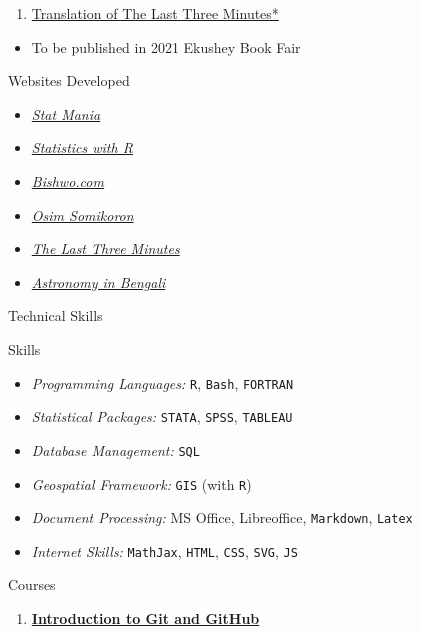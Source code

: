\documentclass[
]{book}
\providecommand{\tightlist}{%
  \setlength{\itemsep}{0pt}\setlength{\parskip}{0pt}}
\begin{document}
\begin{enumerate}
\def\labelenumi{\arabic{enumi}.}
\setcounter{enumi}{4}
\tightlist
\item
  \href{https://l3m.bishwo.com/}{Translation of The Last Three Minutes*}
\end{enumerate}

\begin{itemize}
\tightlist
\item
  To be published in 2021 Ekushey Book Fair
\end{itemize}

Websites Developed

\begin{itemize}
\tightlist
\item
  \href{https://www.statmania.info}{\emph{Stat Mania}}
\item
  \href{https://rstat.statmania.info}{\emph{Statistics with R}}
\item
  \href{https://www.bishwo.com}{\emph{Bishwo.com}}
\item
  \href{https://os.statmania.info}{\emph{Osim Somikoron}}
\item
  \href{https://l3m.bishwo.com/}{\emph{The Last Three Minutes}}
\item
  \href{https://sky.bishwo.com}{\emph{Astronomy in Bengali}}
\end{itemize}

Technical Skills

Skills

\begin{itemize}
\tightlist
\item
  \emph{Programming Languages:} \texttt{R}, \texttt{Bash}, \texttt{FORTRAN}
\item
  \emph{Statistical Packages:} \texttt{STATA}, \texttt{SPSS}, \texttt{TABLEAU}
\item
  \emph{Database Management:} \texttt{SQL}
\item
  \emph{Geospatial Framework:} \texttt{GIS} (with \texttt{R})
\item
  \emph{Document Processing:} MS Office, Libreoffice, \texttt{Markdown}, \texttt{Latex}
\item
  \emph{Internet Skills:} \texttt{MathJax}, \texttt{HTML}, \texttt{CSS}, \texttt{SVG}, \texttt{JS}
\end{itemize}

Courses

\begin{enumerate}
\def\labelenumi{\arabic{enumi}.}
\tightlist
\item
  \href{https://www.coursera.org/learn/introduction-git-github/home/welcome}{\textbf{Introduction to Git and GitHub}}
\end{enumerate}
\end{document}
